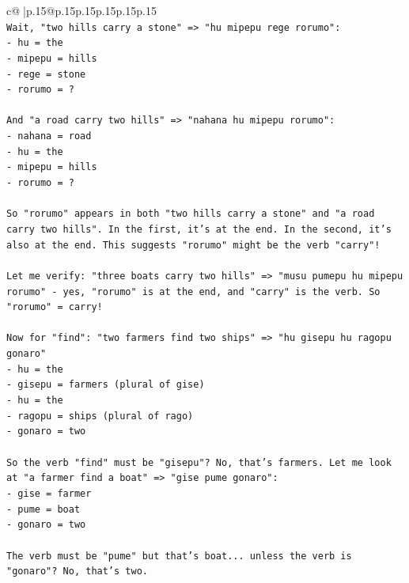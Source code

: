\documentclass{article}
\begin{document}
{\begin{supertabular}{c@{$\;$}|p{.15\linewidth}@{}p{.15\linewidth}p{.15\linewidth}p{.15\linewidth}p{.15\linewidth}p{.15\linewidth}}
{{{\\ 
\texttt{Wait, "two hills carry a stone" => "hu mipepu rege rorumo":} \\
\texttt{{-} hu = the} \\
\texttt{{-} mipepu = hills} \\
\texttt{{-} rege = stone} \\
\texttt{{-} rorumo = ?} \\
\\ 
\texttt{And "a road carry two hills" => "nahana hu mipepu rorumo":} \\
\texttt{{-} nahana = road} \\
\texttt{{-} hu = the} \\
\texttt{{-} mipepu = hills} \\
\texttt{{-} rorumo = ?} \\
\\ 
\texttt{So "rorumo" appears in both "two hills carry a stone" and "a road carry two hills". In the first, it's at the end. In the second, it's also at the end. This suggests "rorumo" might be the verb "carry"!} \\
\\ 
\texttt{Let me verify: "three boats carry two hills" => "musu pumepu hu mipepu rorumo" {-} yes, "rorumo" is at the end, and "carry" is the verb. So "rorumo" = carry!} \\
\\ 
\texttt{Now for "find": "two farmers find two ships" => "hu gisepu hu ragopu gonaro"} \\
\texttt{{-} hu = the} \\
\texttt{{-} gisepu = farmers (plural of gise)} \\
\texttt{{-} hu = the} \\
\texttt{{-} ragopu = ships (plural of rago)} \\
\texttt{{-} gonaro = two} \\
\\ 
\texttt{So the verb "find" must be "gisepu"? No, that's farmers. Let me look at "a farmer find a boat" => "gise pume gonaro":} \\
\texttt{{-} gise = farmer} \\
\texttt{{-} pume = boat} \\
\texttt{{-} gonaro = two} \\
\\ 
\texttt{The verb must be "pume" but that's boat... unless the verb is "gonaro"? No, that's two.} \\
\\ 
}}}
\end{supertabular}}
\end{document}
